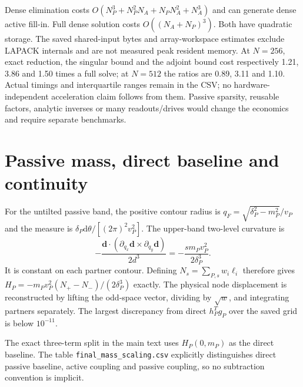 \documentclass[11pt]{article}
\newcommand{\dd}{\mathrm{d}}
\begin{document}
Dense elimination costs $O(N_P^3+N_P^2N_A+N_PN_A^2+N_A^3)$ and can generate dense active fill-in. Full dense solution costs $O((N_A+N_P)^3)$. Both have quadratic storage. The saved shared-input bytes and array-workspace estimates exclude LAPACK internals and are not measured peak resident memory. At $N=256$, exact reduction, the singular bound and the adjoint bound cost respectively 1.21, 3.86 and 1.50 times a full solve; at $N=512$ the ratios are 0.89, 3.11 and 1.10. Actual timings and interquartile ranges remain in the CSV; no hardware-independent acceleration claim follows from them. Passive sparsity, reusable factors, analytic inverses or many readouts/drives would change the economics and require separate benchmarks.

\section{Passive mass, direct baseline and continuity}
For the untilted passive band, the positive contour radius is $q_F=\sqrt{\delta_P^2-m_P^2}/v_P$ and the measure is $\delta_P\dd\theta/[(2\pi)^2v_P^2]$. The upper-band two-level curvature is
\begin{equation}
-\frac{\bm d\cdot(\partial_{q_x}\bm d\times\partial_{q_y}\bm d)}{2d^3}
=-\frac{s m_Pv_P^2}{2\delta_P^3}.
\end{equation}
It is constant on each partner contour. Defining $N_s=\sum_{P,s}w_i\ell_i$ therefore gives $H_P=-m_Pv_P^2(N_+-N_-)/(2\delta_P^3)$ exactly. The physical node displacement is reconstructed by lifting the odd-space vector, dividing by $\sqrt w$, and integrating partners separately. The largest discrepancy from direct $h_P^Tg_P$ over the saved grid is below $10^{-11}$.

The exact three-term split in the main text uses $H_P(0,m_P)$ as the direct baseline. The table \texttt{final\_mass\_scaling.csv} explicitly distinguishes direct passive baseline, active coupling and passive coupling, so no subtraction convention is implicit.
\end{document}
